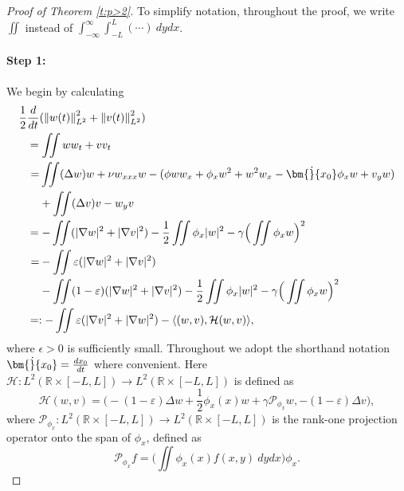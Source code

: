\documentclass[final,11pt]{article}
\theoremstyle{definition} %
\newcommand{\lv}{\left\Vert}
\newcommand{\rv}{\right\Vert}
\newcommand{\half}{\frac{1}{2}}
\theoremstyle{plain}
\theoremstyle{definition} %
\theoremstyle{remark}
\begin{document}
\begin{proof}[Proof of Theorem \ref{t:p>2}]
To simplify notation, throughout the proof, we write $\iint$ instead of $\int_{-\infty}^\infty\int_{-L}^L(\cdots)~dydx$.

\paragraph{Step 1:} We begin by calculating
\begin{align}
\half&\frac{d}{dt}(\lv w (t)\rv_{L^2} ^ {2} + \lv v(t) \rv_{L^2}^{2}) \notag\\
&= \iint ww_{t} + vv_{t} \notag\\ 
&\,\,\begin{aligned}= &\iint   ( \Delta w ) w + \nu w _ {xxx} w -( \phi w w_{x} +  \phi_{x}w ^ { 2 } + w^{2}w_{x} - \bm{\dot}{x_0}\phi_{x}w + v_{y}w) \\
& +\iint ( \Delta v ) v -  w_y v  \end{aligned} \notag\\ 
&=- \iint  (|\nabla w| ^ { 2 } +|\nabla v| ^ { 2 }) - \frac { 1 } { 2 } \iint \phi_{x} | w |^{2} -\gamma\Big(\iint\phi_{x}w\Big)^{2} \notag \\
&\,\,\begin{aligned}=& -\iint  \varepsilon(|\nabla w| ^ { 2 }+ |\nabla v| ^ { 2 })\\ 
&- \iint (1-\varepsilon) (|\nabla w|^2+ |\nabla v| ^ { 2 })- \frac { 1 } { 2 } \iint \phi_{x} | w |^{2} -\gamma\Big(\iint\phi_{x}w\Big)^{2} \end{aligned}\notag \\
& =: -\iint  \varepsilon(|\nabla v| ^ { 2 } +|\nabla w| ^ { 2 }) - \langle (w,v) , \mathcal{H}(w,v)\rangle,\label{e:step1}
\end{align}
where $\epsilon>0$ is sufficiently small. Throughout we adopt the shorthand notation $\bm{\dot}{x_0}=\frac{dx_0}{dt}$ where convenient. Here $\mathcal{H}:L^2(\mathbb{R}\times[-L,L]) \to L^2(\mathbb{R}\times[-L,L])$ is defined as 
\[ 
\mathcal{H}(w,v) = \Big(-(1-\varepsilon)\Delta w + \frac{1}{2}\phi_x(x)w + \gamma \mathcal{P}_{\phi_x}w, -(1-\varepsilon)\Delta v\Big), 
\] 
where $\mathcal{P}_{\phi_x}: L^2(\mathbb{R}\times[-L,L]) \to L^2(\mathbb{R}\times[-L,L])$ is the rank-one projection operator onto the span of $\phi_x$, defined as 
\[
\mathcal{P}_{\phi_x} f = \Big(\iint \phi_x(x) f(x,y)~dy dx\Big) \phi_x.
\]


\end{proof}
\end{document}
